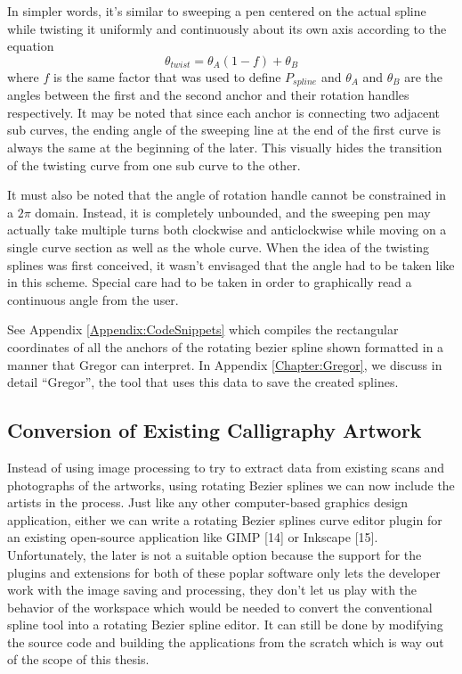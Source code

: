     In simpler words, it’s similar to sweeping a pen centered on the actual spline while twisting it uniformly and continuously about its own axis according to the equation
    \begin{equation}
    \theta_{twist}=\theta_A  (1-f)+ \theta_B
    \end{equation}
    where $f$ is the same factor that was used to define $P_{spline}$ and $\theta_A$ and $\theta_B$ are the angles between the first and the second anchor and their rotation handles respectively. It may be noted that since each anchor is connecting two adjacent sub curves, the ending angle of the sweeping line at the end of the first curve is always the same at the beginning of the later. This visually hides the transition of the twisting curve from one sub curve to the other.

    It must also be noted that the angle of rotation handle cannot be constrained in a $2\pi$ domain. Instead, it is completely unbounded, and the sweeping pen may actually take multiple turns both clockwise and anticlockwise while moving on a single curve section as well as the whole curve. When the idea of the twisting splines was first conceived, it wasn’t envisaged that the angle had to be taken like in this scheme. Special care had to be taken in order to graphically read a continuous angle from the user.

    See Appendix \ref{Appendix:CodeSnippets} which compiles the rectangular coordinates of all the anchors of the rotating bezier spline shown formatted in a manner that Gregor can interpret. In Appendix \ref{Chapter:Gregor}, we discuss in detail ``Gregor'', the tool that uses this data to save the created splines.

\subsection{Conversion of Existing Calligraphy Artwork}
Instead of using image processing to try to extract data from existing scans and photographs of the artworks, using rotating Bezier splines we can now include the artists in the process. Just like any other computer-based graphics design application, either we can write a rotating Bezier splines curve editor plugin for an existing open-source application like GIMP [14] or Inkscape [15]. Unfortunately, the later is not a suitable option because the support for the plugins and extensions for both of these poplar software only lets the developer work with the image saving and processing, they don’t let us play with the behavior of the workspace which would be needed to convert the conventional spline tool into a rotating Bezier spline editor. It can still be done by modifying the source code and building the applications from the scratch which is way out of the scope of this thesis.

